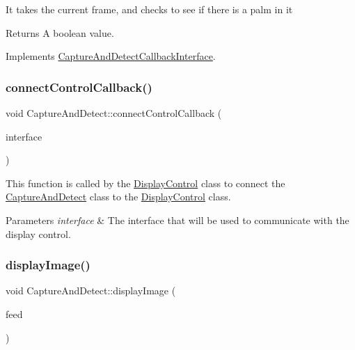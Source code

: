 It takes the current frame, and checks to see if there is a palm in it

\begin{DoxyReturn}{Returns}
A boolean value. 
\end{DoxyReturn}


Implements \hyperlink{classCaptureAndDetectCallbackInterface_a64755838dd5592bae3ca06b4c5a0d72f}{Capture\+And\+Detect\+Callback\+Interface}.

\mbox{\label{classCaptureAndDetect_aa75e3ba836797d18aa02c72bbf975082}} 
\subsubsection{\texorpdfstring{connect\+Control\+Callback()}{connectControlCallback()}}
{\footnotesize\ttfamily void Capture\+And\+Detect\+::connect\+Control\+Callback (\begin{DoxyParamCaption}\item[{\hyperlink{classDisplayControlCallbackInterface}{Display\+Control\+Callback\+Interface} $\ast$}]{interface }\end{DoxyParamCaption})}

This function is called by the \hyperlink{classDisplayControl}{Display\+Control} class to connect the \hyperlink{classCaptureAndDetect}{Capture\+And\+Detect} class to the \hyperlink{classDisplayControl}{Display\+Control} class.


\begin{DoxyParams}{Parameters}
{\em interface} & The interface that will be used to communicate with the display control. \\
\hline
\end{DoxyParams}
\mbox{\label{classCaptureAndDetect_a3f1ba69514a2debbc6b2a03e76f31b65}} 
\subsubsection{\texorpdfstring{display\+Image()}{displayImage()}}
{\footnotesize\ttfamily void Capture\+And\+Detect\+::display\+Image (\begin{DoxyParamCaption}\item[{int}]{feed }\end{DoxyParamCaption})}


